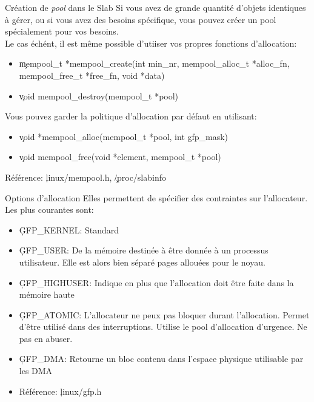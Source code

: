 \begin{frame}[fragile=singleslide]{Création de \emph{pool} dans le Slab}
  Si vous avez  de grande quantité d'objets identiques  à gérer, ou si
  vous avez des besoins spécifique, vous pouvez créer un pool
  spécialement pour vos besoins.\\[2ex]

  Le cas échént, il est  même possible d'utiiser vos propres fonctions
  d'allocation:
  \begin{itemize} 
  \item \c{mempool_t *mempool_create(int min_nr, mempool_alloc_t *alloc_fn, mempool_free_t *free_fn, void *data)}
  \item \c{void mempool_destroy(mempool_t *pool)}
  \end{itemize} 
  Vous pouvez garder la politique d'allocation par défaut en
  utilisant:
  \begin{itemize} 
  \item \c{void *mempool_alloc(mempool_t *pool, int gfp_mask)}
  \item \c{void mempool_free(void *element, mempool_t *pool)}
  \end{itemize} 
  Référence: \c{linux/mempool.h}, \c{/proc/slabinfo}
\end{frame}

\begin{frame}[fragile=singleslide]{Options d'allocation}
  Elles permettent de spécifier  des contraintes sur l'allocateur. Les
  plus courantes sont:
  \begin{itemize} 
  \item \c{GFP_KERNEL}: Standard
  \item  \c{GFP_USER}: De  la  mémoire  destinée à  être  donnée à  un
    processus utilisateur.  Elle est alors bien  séparé pages allouées
    pour le noyau.
  \item \c{GFP_HIGHUSER}:  Indique en plus que  l'allocation doit être
    faite dans la mémoire haute
  \item  \c{GFP_ATOMIC}:  L'allocateur  ne  peux  pas  bloquer  durant
    l'allocation.      Permet     d'être     utilisé      dans     des
    interruptions. Utilise  le pool d'allocation d'urgence.  Ne pas en
    abuser.
  \item \c{GFP_DMA}:  Retourne un bloc contenu  dans l'espace physique
    utilisable par les DMA
  \item Référence: \c{linux/gfp.h}
  \end{itemize} 
\end{frame} 

